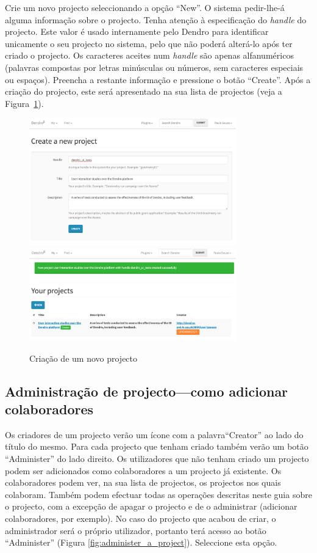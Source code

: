 \documentclass[paper=a4, fontsize=11pt]{scrartcl} %
\numberwithin{equation}{section} %
\numberwithin{figure}{section} %
\numberwithin{table}{section} %
\begin{document}
Crie um novo projecto seleccionando a opção ``New''. O sistema pedir-lhe-á alguma informação sobre o projecto. Tenha atenção à especificação do \emph{handle} do projecto. Este valor é usado internamente pelo Dendro para identificar unicamente o seu projecto no sistema, pelo que não poderá alterá-lo após ter criado o projecto. Os caracteres aceites num \emph{handle} são apenas alfanuméricos (palavras compostas por letras minúsculas ou números, sem caracteres especiais ou espaços). Preencha a restante informação e pressione o botão ``Create''. Após a criação do projecto, este será apresentado na sua lista de projectos (veja a Figura~\ref{fig:creating_a_project}).

\begin{figure}[h!t!]
	\centering
	\includegraphics[width=0.8\textwidth]{Images/creating_a_project}	
	\includegraphics[width=0.8\textwidth]{Images/project_created}	
	\caption{Criação de um novo projecto}
	\label{fig:creating_a_project}
\end{figure}

\subsection{Administração de projecto---como adicionar colaboradores} %
\label{sub:project_administration}

Os criadores de um projecto verão um ícone com a palavra``Creator'' ao lado do título do mesmo. Para cada projecto que tenham criado também verão um botão ``Administer'' do lado direito. Os utilizadores que não tenham criado um projecto podem ser adicionados como colaboradores a um projecto já existente. Os colaboradores podem ver, na sua lista de projectos, os projectos nos quais colaboram. Também podem efectuar todas as operações descritas neste guia sobre o projecto, com a excepção de apagar o projecto e de o administrar (adicionar colaboradores, por exemplo). No caso do projecto que acabou de criar, o administrador será o próprio utilizador, portanto terá acesso ao botão ``Administer'' (Figura \ref{fig:administer_a_project}). Seleccione esta opção.
\end{document}
